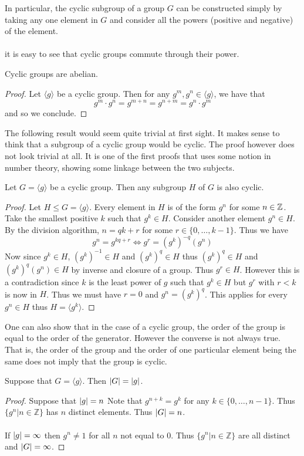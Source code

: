 \documentclass[a4paper]{article}
\begin{document}
In particular, the cyclic subgroup of a group $G$ can be constructed simply by taking any one element in $G$ and consider all the powers (positive and negative) of the element. \\~\\

it is easy to see that cyclic groups commute through their power. 

\begin{lmm}{}{} Cyclic groups are abelian. \tcbline
\begin{proof}
Let $\langle g\rangle$ be a cyclic group. Then for any $g^m,g^n\in\langle g\rangle$, we have that $$g^m\cdot g^n=g^{m+n}=g^{n+m}=g^n\cdot g^m$$ and so we conclude. 
\end{proof}
\end{lmm}

The following result would seem quite trivial at first sight. It makes sense to think that a subgroup of a cyclic group would be cyclic. The proof however does not look trivial at all. It is one of the first proofs that uses some notion in number theory, showing some linkage between the two subjects. 

\begin{prp}{}{} Let $G=\langle g\rangle $ be a cyclic group. Then any subgroup $H$ of $G$ is also cyclic. \tcbline
\begin{proof} Let $H\leq G=\langle g\rangle$. Every element in $H$ is of the form $g^n$ for some $n\in\mathbb{Z}$. Take the smallest positive $k$ such that $g^k\in H$. Consider another element $g^n\in H$. By the division algorithm, $n=qk+r$ for some $r\in\{0,\dots,k-1\}$. Thus we have $$g^n=g^{kq+r}\iff g^r=(g^k)^{-q}(g^n)$$ Now since $g^k\in H$, $(g^k)^{-1}\in H$ and $(g^k)^q\in H$ thus $(g^k)^q\in H$ and $(g^k)^q(g^n)\in H$ by inverse and closure of a group. Thus $g^r\in H$. However this is a contradiction since $k$ is the least power of $g$ such that $g^k\in H$ but $g^r$ with $r<k$ is now in $H$. Thus we must have $r=0$ and $g^n=(g^k)^q$. This applies for every $g^n\in H$ thus $H=\langle g^k\rangle$. 
\end{proof}
\end{prp}

One can also show that in the case of a cyclic group, the order of the group is equal to the order of the generator. However the converse is not always true. That is, the order of the group and the order of one particular element being the same does not imply that the group is cyclic. 

\begin{prp}{}{} Suppose that $G=\langle g\rangle $. Then $\abs{G}=\abs{g}$. \tcbline
\begin{proof} Suppose that $\abs{g}=n$ Note that $g^{n+k}=g^k$ for any $k\in\{0,\dots,n-1\}$. Thus $\{g^n|n\in\mathbb{Z}\}$ has $n$ distinct elements. Thus $\abs{G}=n$. \\~\\
If $\abs{g}=\infty$ then $g^n\neq 1$ for all $n$ not equal to $0$. Thus $\{g^n|n\in\mathbb{Z}\}$ are all distinct and $\abs{G}=\infty$.
\end{proof}
\end{prp}
\end{document}

